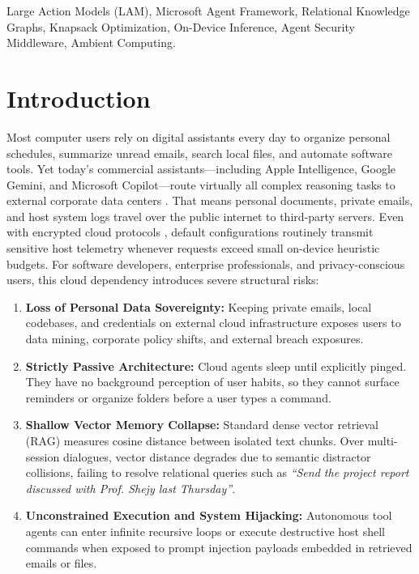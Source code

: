 \documentclass[conference,a4paper]{IEEEtran}
\begin{document}
\begin{IEEEkeywords}
Large Action Models (LAM), Microsoft Agent Framework, Relational Knowledge Graphs, Knapsack Optimization, On-Device Inference, Agent Security Middleware, Ambient Computing.
\end{IEEEkeywords}

\section{Introduction}

Most computer users rely on digital assistants every day to organize personal schedules, summarize unread emails, search local files, and automate software tools. Yet today's commercial assistants---including Apple Intelligence, Google Gemini, and Microsoft Copilot---route virtually all complex reasoning tasks to external corporate data centers \cite{apple2024pcc, google2024geminiprivacy, microsoft2024copilotprivacy}. That means personal documents, private emails, and host system logs travel over the public internet to third-party servers. Even with encrypted cloud protocols \cite{apple2024pcc}, default configurations routinely transmit sensitive host telemetry whenever requests exceed small on-device heuristic budgets. For software developers, enterprise professionals, and privacy-conscious users, this cloud dependency introduces severe structural risks:
\begin{enumerate}
    \item \textbf{Loss of Personal Data Sovereignty:} Keeping private emails, local codebases, and credentials on external cloud infrastructure exposes users to data mining, corporate policy shifts, and external breach exposures.
    \item \textbf{Strictly Passive Architecture:} Cloud agents sleep until explicitly pinged. They have no background perception of user habits, so they cannot surface reminders or organize folders before a user types a command.
    \item \textbf{Shallow Vector Memory Collapse:} Standard dense vector retrieval (RAG) measures cosine distance between isolated text chunks. Over multi-session dialogues, vector distance degrades due to semantic distractor collisions, failing to resolve relational queries such as \textit{``Send the project report discussed with Prof. Shejy last Thursday''}.
    \item \textbf{Unconstrained Execution and System Hijacking:} Autonomous tool agents can enter infinite recursive loops or execute destructive host shell commands when exposed to prompt injection payloads embedded in retrieved emails or files.
\end{enumerate}
\end{document}
